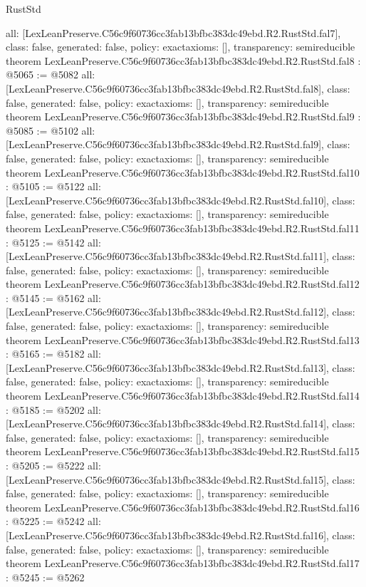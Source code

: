 \begin{lexlean}{RustStd}
\begin{coremodule}
{  all: [LexLeanPreserve.C56c9f60736cc3fab13bfbc383dc49ebd.R2.RustStd.fal7],
  class: false,
  generated: false,
  policy: exact{axioms: []},
  transparency: semireducible
}
theorem LexLeanPreserve.C56c9f60736cc3fab13bfbc383dc49ebd.R2.RustStd.fal8 : @5065 := @5082 {
  all: [LexLeanPreserve.C56c9f60736cc3fab13bfbc383dc49ebd.R2.RustStd.fal8],
  class: false,
  generated: false,
  policy: exact{axioms: []},
  transparency: semireducible
}
theorem LexLeanPreserve.C56c9f60736cc3fab13bfbc383dc49ebd.R2.RustStd.fal9 : @5085 := @5102 {
  all: [LexLeanPreserve.C56c9f60736cc3fab13bfbc383dc49ebd.R2.RustStd.fal9],
  class: false,
  generated: false,
  policy: exact{axioms: []},
  transparency: semireducible
}
theorem LexLeanPreserve.C56c9f60736cc3fab13bfbc383dc49ebd.R2.RustStd.fal10 : @5105 := @5122 {
  all: [LexLeanPreserve.C56c9f60736cc3fab13bfbc383dc49ebd.R2.RustStd.fal10],
  class: false,
  generated: false,
  policy: exact{axioms: []},
  transparency: semireducible
}
theorem LexLeanPreserve.C56c9f60736cc3fab13bfbc383dc49ebd.R2.RustStd.fal11 : @5125 := @5142 {
  all: [LexLeanPreserve.C56c9f60736cc3fab13bfbc383dc49ebd.R2.RustStd.fal11],
  class: false,
  generated: false,
  policy: exact{axioms: []},
  transparency: semireducible
}
theorem LexLeanPreserve.C56c9f60736cc3fab13bfbc383dc49ebd.R2.RustStd.fal12 : @5145 := @5162 {
  all: [LexLeanPreserve.C56c9f60736cc3fab13bfbc383dc49ebd.R2.RustStd.fal12],
  class: false,
  generated: false,
  policy: exact{axioms: []},
  transparency: semireducible
}
theorem LexLeanPreserve.C56c9f60736cc3fab13bfbc383dc49ebd.R2.RustStd.fal13 : @5165 := @5182 {
  all: [LexLeanPreserve.C56c9f60736cc3fab13bfbc383dc49ebd.R2.RustStd.fal13],
  class: false,
  generated: false,
  policy: exact{axioms: []},
  transparency: semireducible
}
theorem LexLeanPreserve.C56c9f60736cc3fab13bfbc383dc49ebd.R2.RustStd.fal14 : @5185 := @5202 {
  all: [LexLeanPreserve.C56c9f60736cc3fab13bfbc383dc49ebd.R2.RustStd.fal14],
  class: false,
  generated: false,
  policy: exact{axioms: []},
  transparency: semireducible
}
theorem LexLeanPreserve.C56c9f60736cc3fab13bfbc383dc49ebd.R2.RustStd.fal15 : @5205 := @5222 {
  all: [LexLeanPreserve.C56c9f60736cc3fab13bfbc383dc49ebd.R2.RustStd.fal15],
  class: false,
  generated: false,
  policy: exact{axioms: []},
  transparency: semireducible
}
theorem LexLeanPreserve.C56c9f60736cc3fab13bfbc383dc49ebd.R2.RustStd.fal16 : @5225 := @5242 {
  all: [LexLeanPreserve.C56c9f60736cc3fab13bfbc383dc49ebd.R2.RustStd.fal16],
  class: false,
  generated: false,
  policy: exact{axioms: []},
  transparency: semireducible
}
theorem LexLeanPreserve.C56c9f60736cc3fab13bfbc383dc49ebd.R2.RustStd.fal17 : @5245 := @5262 {
}
\end{coremodule}
\end{lexlean}
